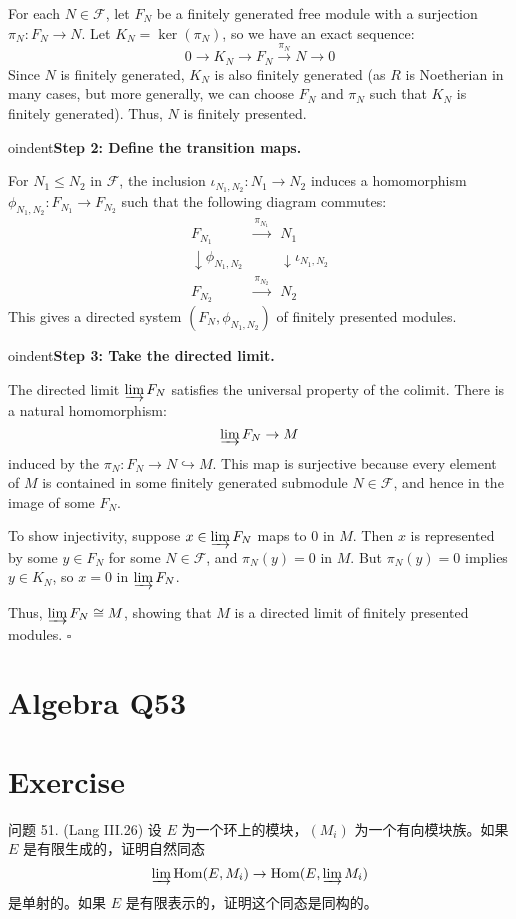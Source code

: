 \documentclass[12pt]{book}
\begin{document}
For each $N \in \mathcal{F}$, let $F_N$ be a finitely generated free module with a surjection $\pi_N: F_N \to N$. Let $K_N = \ker(\pi_N)$, so we have an exact sequence:
\[
0 \to K_N \to F_N \xrightarrow{\pi_N} N \to 0
\]
Since $N$ is finitely generated, $K_N$ is also finitely generated (as $R$ is Noetherian in many cases, but more generally, we can choose $F_N$ and $\pi_N$ such that $K_N$ is finitely generated). Thus, $N$ is finitely presented.

 oindent\textbf{Step 2: Define the transition maps.}

For $N_1 \leq N_2$ in $\mathcal{F}$, the inclusion $\iota_{N_1, N_2}: N_1 \to N_2$ induces a homomorphism $\phi_{N_1, N_2}: F_{N_1} \to F_{N_2}$ such that the following diagram commutes:
\[
\begin{array}{ccc}
F_{N_1} & \xrightarrow{\pi_{N_1}} & N_1 \\
\downarrow{\phi_{N_1, N_2}} & & \downarrow{\iota_{N_1, N_2}} \\
F_{N_2} & \xrightarrow{\pi_{N_2}} & N_2
\end{array}
\]
This gives a directed system $(F_N, \phi_{N_1, N_2})$ of finitely presented modules.

 oindent\textbf{Step 3: Take the directed limit.}

The directed limit $\varinjlim F_N$ satisfies the universal property of the colimit. There is a natural homomorphism:
\[
\varinjlim F_N \to M
\]
induced by the $\pi_N: F_N \to N \hookrightarrow M$. This map is surjective because every element of $M$ is contained in some finitely generated submodule $N \in \mathcal{F}$, and hence in the image of some $F_N$.

To show injectivity, suppose $x \in \varinjlim F_N$ maps to $0$ in $M$. Then $x$ is represented by some $y \in F_N$ for some $N \in \mathcal{F}$, and $\pi_N(y) = 0$ in $M$. But $\pi_N(y) = 0$ implies $y \in K_N$, so $x = 0$ in $\varinjlim F_N$.

Thus, $\varinjlim F_N \cong M$, showing that $M$ is a directed limit of finitely presented modules. $\square$
\newpage
\section{Algebra Q53}
\section*{Exercise}
问题 51. (Lang III.26) 设 $E$ 为一个环上的模块，$(M_i)$ 为一个有向模块族。如果 $E$ 是有限生成的，证明自然同态
\[
\varinjlim \operatorname{Hom}(E, M_i) \to \operatorname{Hom}(E, \varinjlim M_i)
\]
是单射的。如果 $E$ 是有限表示的，证明这个同态是同构的。
\end{document}
